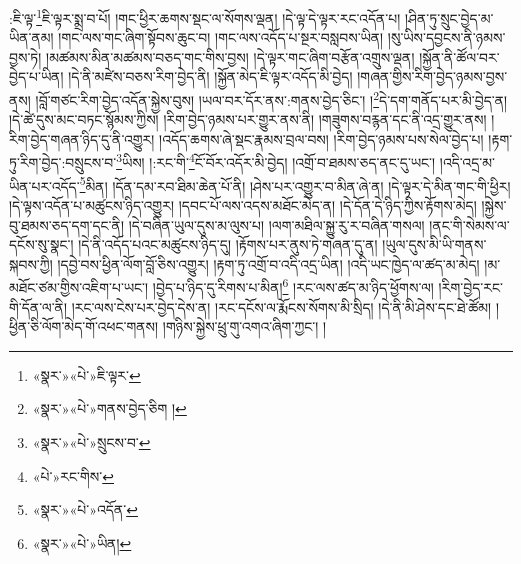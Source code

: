 :ཇི་ལྟ་\footnote{«སྣར་»«པེ་»ཇི་ལྟར་}ཇི་ལྟར་སྨྲ་བ་པོ། །གང་ཕྱིར་ཆགས་སྡང་ལ་སོགས་ལྡན། །དེ་ལྟ་དེ་ལྟར་རང་འདོན་པ། །ཤིན་ཏུ་སྲུང་བྱེད་མ་ཡིན་ནམ། །གང་ལས་གང་ཞིག་སྟོབས་ཆུང་བ། །གང་ལས་འདོད་པ་སྔར་བསླབས་ཡིན། །སུ་ཡིས་དབྱངས་ནི་ཉམས་བྱས་ཏེ། །མཚམས་མིན་མཚམས་བཅད་གང་གིས་བྱས། །དེ་ལྟར་གང་ཞིག་བརྩོན་འགྲུས་ལྡན། །སྐྱོན་ནི་ཚོལ་བར་བྱེད་པ་ཡིན། །དེ་ནི་མཛེས་བཅས་རིག་བྱེད་ནི། །སྐྱོན་མེད་ཇི་ལྟར་འདོད་མི་བྱེད། །གཞན་གྱིས་རིག་བྱེད་ཉམས་བྱས་ནས། །བློ་གཙང་རིག་བྱེད་འདོན་སྐྱེས་བུས། །ཡལ་བར་དོར་ནས་:གནས་བྱེད་ཅིང་། །\footnote{«སྣར་»«པེ་»གནས་བྱེད་ཅིག །}དེ་དག་གནོད་པར་མི་བྱེད་ན། །དེ་ཚེ་དུས་མང་བཏང་སྙོམས་ཀྱིས། །རིག་བྱེད་ཉམས་པར་གྱུར་ནས་ནི། །གཟུགས་བརྙན་དང་ནི་འདྲ་གྱུར་ནས། །རིག་བྱེད་གཞན་ཉིད་དུ་ནི་འགྱུར། །འདོད་ཆགས་ཞེ་སྡང་རྣམས་བྲལ་བས། །རིག་བྱེད་ཉམས་པས་སེལ་བྱེད་པ། །རྟག་ཏུ་རིག་བྱེད་:བསྲུངས་བ་\footnote{«སྣར་»«པེ་»སྲུངས་བ་}ཡིས། །:རང་གི་\footnote{«པེ་»རང་གིས་}ངོ་བོར་འདོར་མི་བྱེད། །འགྲོ་བ་ཐམས་ཅད་ནང་དུ་ཡང་། །འདི་འདྲ་མ་ཡིན་པར་འདོད་\footnote{«སྣར་»«པེ་»འདོན་}མིན། །དོན་དམ་རབ་ཐིམ་ཆེན་པོ་ནི། །ཤེས་པར་འགྱུར་བ་མིན་ཞེ་ན། །དེ་ལྟར་དེ་མིན་གང་གི་ཕྱིར། །དེ་ལྟས་འདོན་པ་མཚུངས་ཉིད་འགྱུར། །དབང་པོ་ལས་འདས་མཐོང་མེད་ན། །དེ་དོན་དེ་ཉིད་ཀྱིས་རྟོགས་མེད། །སྐྱེས་བུ་ཐམས་ཅད་དག་དང་ནི། །དེ་བཞིན་ཡུལ་དུས་མ་ལུས་པ། །ལག་མཐིལ་སྐྱུ་རུ་ར་བཞིན་གསལ། །ནང་གི་སེམས་ལ་དངོས་སུ་སྣང་། །དེ་ནི་འདོད་པའང་མཚུངས་ཉིད་དུ། །རྟོགས་པར་ནུས་ཏེ་གཞན་དུ་ན། །ཡུལ་དུས་མི་ཡི་གནས་སྐབས་ཀྱི། །དབྱེ་བས་ཕྱིན་ལོག་བློ་ཅིས་འགྱུར། །རྟག་ཏུ་འགྲོ་བ་འདི་འདྲ་ཡིན། །འདི་ཡང་ཁྱེད་ལ་ཚད་མ་མེད། །མ་མཐོང་ཙམ་གྱིས་འཇིག་པ་ཡང་། །བྱེད་པ་ཉིད་དུ་རིགས་པ་མིན།\footnote{«སྣར་»«པེ་»ཡིན།} །རང་ལས་ཚད་མ་ཉིད་ཕྱོགས་ལ། །རིག་བྱེད་རང་གི་དོན་ལ་ནི། །རང་ལས་ངེས་པར་བྱེད་དེས་ན། །རང་དངོས་ལ་རྨོངས་སོགས་མི་སྲིད། །དེ་ནི་མི་ཤེས་དང་ཐེ་ཚོམ། །ཕྱིན་ཅི་ལོག་མེད་གོ་འཕང་གནས། །གཉིས་སྐྱེས་ཕྲུ་གུ་འགའ་ཞིག་ཀྱང་། །
